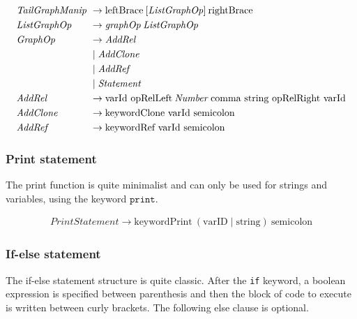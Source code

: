 \begin{align*}
    \omit $\mathit{TailGraphManip}$ \hfil &\rightarrow \text{leftBrace} \: [\mathit{ListGraphOp}]  \: \text{rightBrace} \\
    \omit $\mathit{ListGraphOp}$ \hfil &\rightarrow \mathit{graphOp} \: \mathit{ListGraphOp} \\
    \omit $\mathit{GraphOp}$ \hfil &\rightarrow \mathit{AddRel}  \\
    & \mid \mathit{AddClone} \\
    & \mid \mathit{AddRef} \\
    & \mid \mathit{Statement} \\
    \omit $\mathit{AddRel}$ \hfil & \rightarrow \text{varId opRelLeft} \: \mathit{Number} \: \text{comma string opRelRight varId} \\
    \omit $\mathit{AddClone}$ \hfil & \rightarrow \text{keywordClone varId semicolon} \\
    \omit $\mathit{AddRef}$ \hfil & \rightarrow \text{keywordRef varId semicolon} \\
\end{align*}

\subsubsection*{Print statement}

The print function is quite minimalist and can only be used for strings and variables, using the keyword $\texttt{print}$.

\begin{align*}
    \mathit{PrintStatement} \rightarrow \text{keywordPrint} \: (\text{varID} \mid \text{string}) \: \text{semicolon}
\end{align*}

\subsubsection*{If-else statement}

The if-else statement structure is quite classic.
After the \texttt{if} keyword, a boolean expression is specified between parenthesis and then the block of code to execute is written between curly brackets.
The following else clause is optional.

